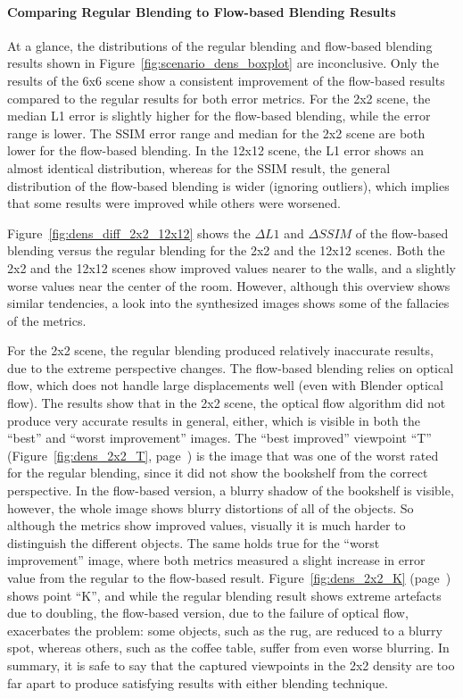 \paragraph{Comparing Regular Blending to Flow-based Blending Results}
At a glance, the distributions of the regular blending and flow-based blending results shown in Figure~\ref{fig:scenario_dens_boxplot} are inconclusive. Only the results of the 6x6 scene show a consistent improvement of the flow-based results compared to the regular results for both error metrics. For the 2x2 scene, the median L1 error is slightly higher for the flow-based blending, while the error range is lower. The SSIM error range and median for the 2x2 scene are both lower for the flow-based blending. In the 12x12 scene, the L1 error shows an almost identical distribution, whereas for the SSIM result, the general distribution of the flow-based blending is wider (ignoring outliers), which implies that some results were improved while others were worsened.

Figure~\ref{fig:dens_diff_2x2_12x12} shows the $\Delta L1$ and $\Delta SSIM$ of the flow-based blending versus the regular blending for the 2x2 and the 12x12 scenes. Both the 2x2 and the 12x12 scenes show improved values nearer to the walls, and a slightly worse values near the center of the room. However, although this overview shows similar tendencies, a look into the synthesized images shows some of the fallacies of the metrics. 

For the 2x2 scene, the regular blending produced relatively inaccurate results, due to the extreme perspective changes. The flow-based blending relies on optical flow, which does not handle large displacements well (even with Blender optical flow). The results show that in the 2x2 scene, the optical flow algorithm did not produce very accurate results in general, either, which is visible in both the ``best'' and ``worst improvement'' images.
The ``best improved'' viewpoint ``T'' (Figure~\ref{fig:dens_2x2_T}, page~\pageref{fig:dens_2x2_T}) is the image that was one of the worst rated for the regular blending, since it did not show the bookshelf from the correct perspective. In the flow-based version, a blurry shadow of the bookshelf is visible, however, the whole image shows blurry distortions of all of the objects. So although the metrics show improved values, visually it is much harder to distinguish the different objects.
The same holds true for the ``worst improvement'' image, where both metrics measured a slight increase in error value from the regular to the flow-based result. Figure~\ref{fig:dens_2x2_K} (page~\pageref{fig:dens_2x2_K}) shows point ``K'', and while the regular blending result shows extreme artefacts due to doubling, the flow-based version, due to the failure of optical flow, exacerbates the problem: some objects, such as the rug, are reduced to a blurry spot, whereas others, such as the coffee table, suffer from even worse blurring. In summary, it is safe to say that the captured viewpoints in the 2x2 density are too far apart to produce satisfying results with either blending technique.

